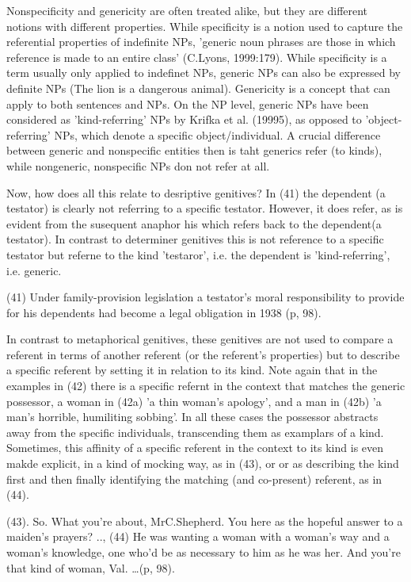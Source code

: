 \documentclass[11pt,a4paper]{article}
\begin{document}
	Nonspecificity and genericity are often treated alike, but they are different notions with different properties. While specificity
	is a notion used to capture the referential properties of indefinite NPs, 'generic noun phrases are those in which 
	reference is made to an entire class' (C.Lyons, 1999:179). While specificity is a term usually only applied to indefinet
	NPs, generic NPs can also be expressed by definite NPs (The lion is a dangerous animal). Genericity is a concept that 
	can apply to both sentences and NPs. On the NP level, generic NPs have been considered as 'kind-referring' NPs by Krifka et al. (19995), 
	as opposed to 'object-referring' NPs, which denote a specific object/individual. A crucial difference between generic
	and nonspecific entities then is taht generics refer (to kinds), while nongeneric, nonspecific NPs don not refer at all.
	
	Now, how does all this relate to desriptive genitives? In (41) the dependent (a testator) is clearly not referring to 
	a specific testator. However, it does refer, as is evident from the susequent anaphor his which refers back to the 
	dependent(a testator). In contrast to determiner genitives this is not reference to a specific testator but referne to the 
	kind 'testaror', i.e. the dependent is 'kind-referring', i.e. generic.
	
	(41) Under family-provision legislation a testator's moral responsibility to provide for his dependents had become 
	a legal obligation in 1938 (p, 98).
	
	In contrast to metaphorical genitives, these genitives are not used to compare a referent in terms of another referent
	(or the referent's properties) but to describe a specific referent by setting it in relation to its kind. Note again
	that in the examples in (42) there is a specific refernt in the context that matches the generic possessor, a woman
	in (42a) 'a thin woman's apology', and a man in (42b) 'a man's horrible, humiliting sobbing'. In all these cases the 
	possessor abstracts away from the specific individuals, transcending them as examplars of a kind. Sometimes, this affinity
	of a specific referent in the context to its kind is even makde explicit, in a kind of mocking way, as in (43), or 
	or as describing the kind first and then finally identifying the matching (and co-present) referent, as in (44). 
	
	(43). So. What you're about, MrC.Shepherd. You here as the hopeful answer to a maiden's prayers? ..,
	(44) He was wanting a woman with a woman's way and a woman's knowledge, one who'd be as necessary to him as he was
	her. And you're that kind of woman, Val. \ldots{}(p, 98).
	
\end{document}
